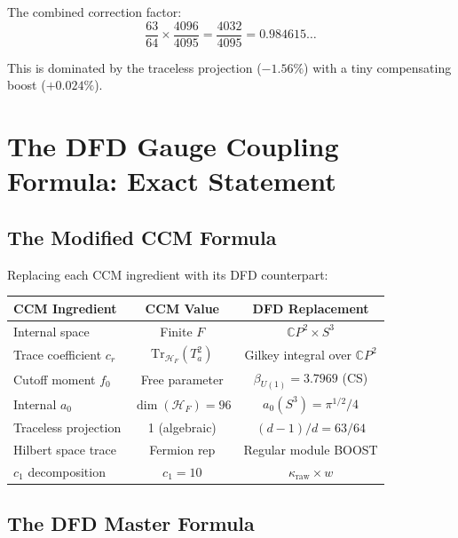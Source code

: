 \documentclass[12pt,a4paper]{article}
\begin{document}
The combined correction factor:
\begin{equation}
\frac{63}{64} \times \frac{4096}{4095} = \frac{4032}{4095} = 0.984615\ldots
\end{equation}

This is dominated by the traceless projection ($-1.56\%$) with a tiny
compensating boost ($+0.024\%$).

\section{The DFD Gauge Coupling Formula: Exact Statement}
\label{sec:dfd-formula}

\subsection{The Modified CCM Formula}

Replacing each CCM ingredient with its DFD counterpart:

\begin{center}
\renewcommand{\arraystretch}{1.4}
\begin{tabular}{p{5.5cm}cc}
\toprule
\textbf{CCM Ingredient} & \textbf{CCM Value} & \textbf{DFD Replacement} \\
\midrule
Internal space & Finite $F$ & $\mathbb{C}P^2 \times S^3$ \\
Trace coefficient $c_r$ & $\mathrm{Tr}_{\mathcal{H}_F}(T_a^2)$ &
  Gilkey integral over $\mathbb{C}P^2$ \\
Cutoff moment $f_0$ & Free parameter & $\beta_{U(1)} = 3.7969$ (CS) \\
Internal $a_0$ & $\dim(\mathcal{H}_F) = 96$ &
  $a_0(S^3) = \pi^{1/2}/4$ \\
Traceless projection & 1 (algebraic) & $(d-1)/d = 63/64$ \\
Hilbert space trace & Fermion rep & Regular module BOOST \\
$c_1$ decomposition & $c_1 = 10$ &
  $\kappa_{\mathrm{raw}} \times w$ \\
\bottomrule
\end{tabular}
\end{center}

\subsection{The DFD Master Formula}
\end{document}
